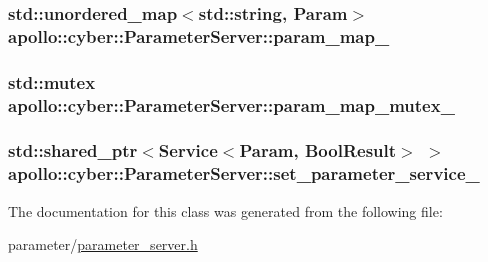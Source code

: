 \hypertarget{classapollo_1_1cyber_1_1ParameterServer_acad7d9ac54e984ba5e857366b4c80e7e}{
\subsubsection[{param\-\_\-map\-\_\-}]{\setlength{\rightskip}{0pt plus 5cm}std\-::unordered\-\_\-map$<$std\-::string, {\bf Param}$>$ apollo\-::cyber\-::\-Parameter\-Server\-::param\-\_\-map\-\_\-\hspace{0.3cm}{\ttfamily [private]}}}\label{classapollo_1_1cyber_1_1ParameterServer_acad7d9ac54e984ba5e857366b4c80e7e}
\hypertarget{classapollo_1_1cyber_1_1ParameterServer_aa18f1fc802ab7bef852a7c4f37d18b1d}{
\subsubsection[{param\-\_\-map\-\_\-mutex\-\_\-}]{\setlength{\rightskip}{0pt plus 5cm}std\-::mutex apollo\-::cyber\-::\-Parameter\-Server\-::param\-\_\-map\-\_\-mutex\-\_\-\hspace{0.3cm}{\ttfamily [private]}}}\label{classapollo_1_1cyber_1_1ParameterServer_aa18f1fc802ab7bef852a7c4f37d18b1d}
\hypertarget{classapollo_1_1cyber_1_1ParameterServer_a2f6c6c91e98fd38bbc3dfdbee24746d3}{
\subsubsection[{set\-\_\-parameter\-\_\-service\-\_\-}]{\setlength{\rightskip}{0pt plus 5cm}std\-::shared\-\_\-ptr$<${\bf Service}$<${\bf Param}, {\bf Bool\-Result}$>$ $>$ apollo\-::cyber\-::\-Parameter\-Server\-::set\-\_\-parameter\-\_\-service\-\_\-\hspace{0.3cm}{\ttfamily [private]}}}\label{classapollo_1_1cyber_1_1ParameterServer_a2f6c6c91e98fd38bbc3dfdbee24746d3}


The documentation for this class was generated from the following file\-:\begin{DoxyCompactItemize}
\item 
parameter/\hyperlink{parameter__server_8h}{parameter\-\_\-server.\-h}\end{DoxyCompactItemize}
